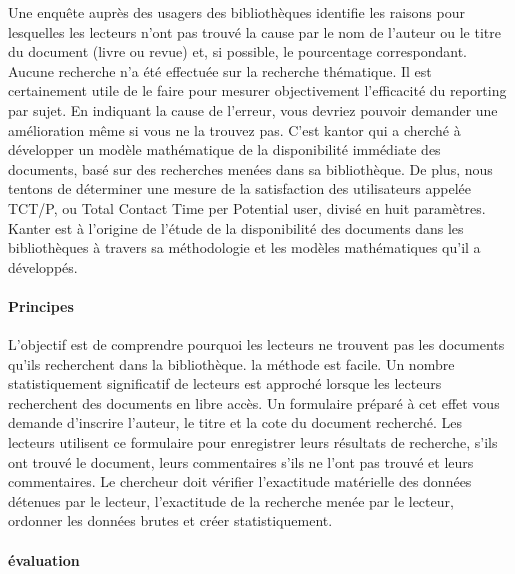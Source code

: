 \documentclass[french,a4paper,12pt]{article}
\begin{document}
\quad Une enquête auprès des usagers des bibliothèques identifie les raisons pour lesquelles les lecteurs n'ont pas trouvé la cause par le nom de l'auteur ou le titre du document (livre ou revue) et, si possible, le pourcentage correspondant. Aucune recherche n'a été effectuée sur la recherche thématique.
Il est certainement utile de le faire pour mesurer objectivement l'efficacité du reporting par sujet. En indiquant la cause de l'erreur, vous devriez pouvoir demander une amélioration même si vous ne la trouvez pas. 
\quad C'est kantor qui a cherché à développer un modèle mathématique de la disponibilité immédiate des documents, basé sur des recherches menées dans sa bibliothèque. De plus, nous tentons de déterminer une mesure de la satisfaction des utilisateurs appelée TCT/P, ou Total Contact Time per Potential user, divisé en huit paramètres. Kanter est à l'origine de l'étude de la disponibilité des documents dans les bibliothèques à travers sa méthodologie et les modèles mathématiques qu'il a développés.

 \paragraph{Principes}  
 
 \quad L'objectif est de comprendre pourquoi les lecteurs ne trouvent pas les documents qu'ils recherchent dans la bibliothèque. la méthode est facile. Un nombre statistiquement significatif de lecteurs est approché lorsque les lecteurs recherchent des documents en libre accès. Un formulaire préparé à cet effet vous demande d'inscrire l'auteur, le titre et la cote du document recherché. Les lecteurs utilisent ce formulaire pour enregistrer leurs résultats de recherche, s'ils ont trouvé le document, leurs commentaires s'ils ne l'ont pas trouvé et leurs commentaires. Le chercheur doit vérifier l'exactitude matérielle des données détenues par le lecteur, l'exactitude de la recherche menée par le lecteur, ordonner les données brutes et créer statistiquement.
 
 \paragraph{évaluation}  
 
\end{document}
